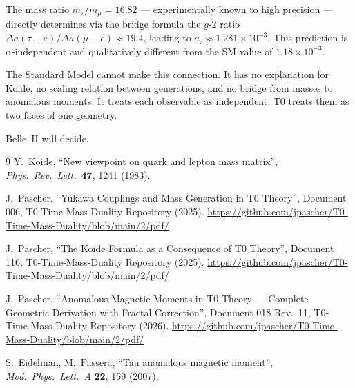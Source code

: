 The mass ratio $m_\tau/m_\mu = 16.82$ --- experimentally known to high precision --- directly determines via the bridge formula the $g$-$2$ ratio $\Delta a(\tau{-}e)/\Delta a(\mu{-}e) \approx 19.4$, leading to $a_\tau \approx 1.281 \times 10^{-3}$. This prediction is $\alpha$-independent and qualitatively different from the SM value of $1.18 \times 10^{-3}$.

The Standard Model cannot make this connection. It has no explanation for Koide, no scaling relation between generations, and no bridge from masses to anomalous moments. It treats each observable as independent. T0 treats them as two faces of one geometry.

Belle~II will decide.

\begin{thebibliography}{9}
	 Y.~Koide, ``New viewpoint on quark and lepton mass matrix'', 
	\textit{Phys.\ Rev.\ Lett.}\ \textbf{47}, 1241 (1983).
	
	 J.~Pascher, ``Yukawa Couplings and Mass Generation in T0 Theory'', 
	Document 006, T0-Time-Mass-Duality Repository (2025).
	\url{https://github.com/jpascher/T0-Time-Mass-Duality/blob/main/2/pdf/}
	
	 J.~Pascher, ``The Koide Formula as a Consequence of T0 Theory'', 
	Document 116, T0-Time-Mass-Duality Repository (2025).
	\url{https://github.com/jpascher/T0-Time-Mass-Duality/blob/main/2/pdf/}
	
	 J.~Pascher, ``Anomalous Magnetic Moments in T0 Theory --- Complete Geometric Derivation with Fractal Correction'', 
	Document 018 Rev.~11, T0-Time-Mass-Duality Repository (2026).
	\url{https://github.com/jpascher/T0-Time-Mass-Duality/blob/main/2/pdf/}
	
	 S.~Eidelman, M.~Passera, ``Tau anomalous magnetic moment'', 
	\textit{Mod.\ Phys.\ Lett.\ A} \textbf{22}, 159 (2007).
\end{thebibliography}
